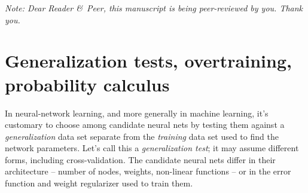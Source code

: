 \documentclass[\ifafour a4paper,12pt,\else a5paper,10pt,\fi%
onecolumn,oneside,article,%
british%
]{memoir}
\title{\propertitle}
\author{%
\iftrue%
\hspace*{\stretch{1}}%
\parbox{0.5\linewidth}%
{\protect\centering Andr\'es\\%
\footnotesize\epost{\email{ivan.a.davidovich}{ntnu.no}}}%
\hspace*{\stretch{1}}%
\parbox{0.5\linewidth}%
{\protect\centering Luca\\%
\footnotesize\epost{\email{piero.mana}{ntnu.no}}}%
\hspace*{\stretch{1}}%
\else%
Luca\\{\footnotesize\epost{\email{piero.mana}{ntnu.no}}%
}\fi%
}
\date{Draft of \today\ (first drafted \firstdraft)}
\theoremstyle{remark}
\theoremstyle{innote}
\newcommand*{\amp}{\&}
\newcommand*{\asudedication}[1]{%
{\par\centering\textit{#1}\par}}
\renewcommand*{\|}{\mathpunct{|}}
\newcommand*{\puzzle}{\maltese}
\newcommand{\mynote}[1]{ {\color{notecolour}\puzzle\ #1}}
\begin{document}
\captiondelim{\quad}\captionnamefont{\footnotesize}\captiontitlefont{\footnotesize}
\frenchspacing

\maketitle
\ifpublic
\abstractrunin
\abslabeldelim{}
\renewcommand*{\abstractname}{}
\setlength{\absleftindent}{0pt}
\setlength{\absrightindent}{0pt}
\setlength{\abstitleskip}{-\absparindent}
\begin{abstract}%
  \noindent \mynote{rewrite} The use of generalization error for testing and the phenomenon
  of overtraining are explained geometrically and given a Bayesian
  interpretation.
\end{abstract}\fi

\frenchspacing


\iftrue
\noindent\emph{\footnotesize Note: Dear Reader \amp\ Peer, this manuscript is
  being peer-reviewed by you. Thank you.}
\fi

\section{Generalization tests, overtraining, probability calculus}
\label{sec:gentest_overtr}

In neural-network learning, and more generally in machine learning, it's
customary to choose among candidate neural nets by testing them against a
\emph{generalization} data set separate from the \emph{training} data set
used to find the network parameters. Let's call this a \emph{generalization
  test}; it may assume different forms, including cross-validation. The
candidate neural nets differ in their architecture -- number of nodes,
weights, non-linear functions -- or in the error function and weight
regularizer used to train them.
\end{document}
